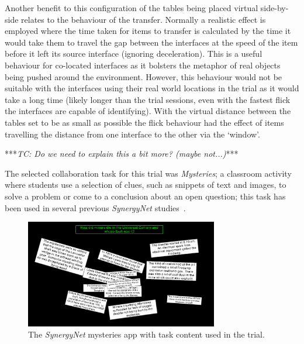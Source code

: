 \documentclass[a4paper,11pt]{article}
\begin{document}
Another benefit to this configuration of the tables being placed virtual side-by-side relates to the behaviour of the transfer.
Normally a realistic effect is employed where the time taken for items to transfer is calculated by the time it would take them to travel the gap between the interfaces at the speed of the item before it left its source interface (ignoring deceleration).
This is a useful behaviour for co-located interfaces as it bolsters the metaphor of real objects being pushed around the environment.
However, this behaviour would not be suitable with the interfaces using their real world locations in the trial as it would take a long time (likely longer than the trial sessions, even with the fastest flick the interfaces are capable of identifying).
With the virtual distance between the tables set to be as small as possible the flick behaviour had the effect of items travelling the distance from one interface to the other via the `window'.


***{\emph{TC: Do we need to explain this a bit more? (maybe not...)}}***

The selected collaboration task for this trial was {\emph{Mysteries}}; a classroom activity where students use a selection of clues, such as snippets of text and images, to solve a problem or come to a conclusion about an open question; this task has been used in several previous {\emph{SynergyNet}} studies~\cite{mercier:2013,mercier:2014,mercier:2015}.

\begin{figure}[h]
 \centering
   \includegraphics[width=0.75\textwidth]{figures/flickmysteryexample.png}
   \caption{The {\emph{SynergyNet}} mysteries app with task content used in the trial.}
   \label{fig:FlickMysteryExample}
\end{figure}
\end{document}
